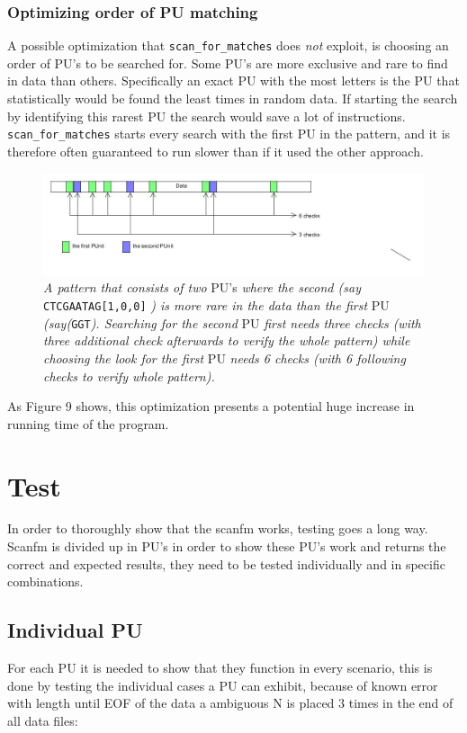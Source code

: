 \documentclass[12pt]{article}
\newcommand{\scm}{\texttt{scan\_for\_matches} }
\newcommand{\pu}{PU }
\newcommand{\pus}{PU's }
\begin{document}
\subsubsection{Optimizing order of \pu matching}
A possible optimization that \scm does \textit{not} exploit, is choosing an order of \pus to be searched for.
Some \pus are more exclusive and rare to find in data than others. Specifically an exact \pu with the most
letters is the \pu that statistically would be found the least times in random data. If starting the search by
identifying this rarest \pu the search would save a lot of instructions. \scm starts every search with the 
first \pu in the pattern, and it is therefore often guaranteed to run slower than if it used the other approach.
\begin{figure}[H]
\begin{center}
\includegraphics[scale=0.65]{opti1.jpg}
\end{center}
\caption{\textit{A pattern that consists of two} \pus \textit{where the second (say} \texttt{CTCGAATAG[1,0,0]}
\textit{) is more rare in the data than the first} \pu \textit{(say(}\texttt{GGT}\textit{). Searching for the 
second} \pu \textit{first needs three checks (with three additional check afterwards to verify the whole pattern)
while choosing the look for the first} \pu \textit{needs 6 checks (with 6 following checks to verify whole pattern).}}
\end{figure}
\noindent As Figure 9 shows, this optimization presents a potential huge increase in running time of the program. \newpage


\section{Test}
In order to thoroughly show that the scanfm works, testing goes a long way. Scanfm is divided up in \pus in order to
show these \pus work and returns the correct and expected results, they need to be tested individually and in specific
combinations.

\subsection{Individual \pu}
For each \pu it is needed to show that they function in every scenario, this is done by testing the individual cases a \pu
can exhibit, because of known error with length until EOF of the data a ambiguous N is placed 3 times in the end of all data files:
\end{document}
